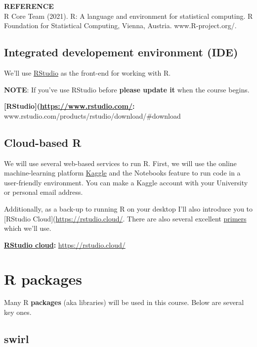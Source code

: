 \documentclass[
]{book}
\begin{document}
\textbf{REFERENCE}\\
R Core Team (2021). R: A language and environment for statistical computing. R Foundation for Statistical Computing, Vienna, Austria. www.R-project.org/.

\hypertarget{integrated-developement-environment-ide}{%
\subsection{Integrated developement environment (IDE)}\label{integrated-developement-environment-ide}}

We'll use \href{https://www.rstudio.com/}{RStudio} as the front-end for working with R.

\textbf{NOTE}: If you've use RStudio before \textbf{please update it} when the course begins.

\textbf{{[}RStudio{]}(\url{https://www.rstudio.com/}:} www.rstudio.com/products/rstudio/download/\#download

\hypertarget{cloud-based-r}{%
\subsection{Cloud-based R}\label{cloud-based-r}}

We will use several web-based services to run R. First, we will use the online machine-learning platform \href{https://www.kaggle.com/}{Kaggle} and the Notebooks feature to run code in a user-friendly environment. You can make a Kaggle account with your University or personal email address.

Additionally, as a back-up to running R on your desktop I'll also introduce you to {[}RStudio Cloud{]}(\url{https://rstudio.cloud/}. There are also several excellent \href{https://rstudio.cloud/learn/primers}{primers} which we'll use.

\textbf{\href{https://rstudio.cloud/}{RStudio cloud}:} \url{https://rstudio.cloud/}

\hypertarget{r-packages}{%
\section{R packages}\label{r-packages}}

Many R \textbf{packages} (aka libraries) will be used in this course. Below are several key ones.

\hypertarget{swirl}{%
\subsection{swirl}\label{swirl}}
\end{document}
